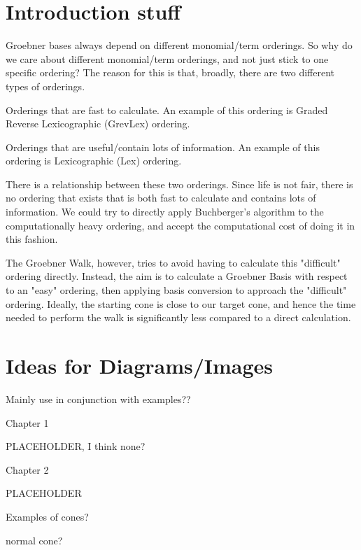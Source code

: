 \documentclass[12pt,a4paper]{report}
\begin{document}
\section{Introduction stuff}

Groebner bases always depend on different monomial/term orderings. So why do we care about different monomial/term orderings, and not just stick to one specific ordering? The reason for this is that, broadly, there are two different types of orderings.
\begin{list}
    \item Orderings that are fast to calculate. An example of this ordering is Graded Reverse Lexicographic (GrevLex) ordering.
    \item Orderings that are useful/contain lots of information. An example of this ordering is Lexicographic (Lex) ordering.
\end{list}
There is a relationship between these two orderings. Since life is not fair, there is no ordering that exists that is both fast to calculate and contains lots of information. We could try to directly apply Buchberger's algorithm to the computationally heavy ordering, and accept the computational cost of doing it in this fashion.

The Groebner Walk, however, tries to avoid having to calculate this "difficult" ordering directly. Instead, the aim is to calculate a Groebner Basis with respect to an "easy" ordering, then applying basis conversion to approach the "difficult" ordering. Ideally, the starting cone is close to our target cone, and hence the time needed to perform the walk is significantly less compared to a direct calculation.



\section{Ideas for Diagrams/Images}
Mainly use in conjunction with examples??

Chapter 1
\begin{list}
    \item PLACEHOLDER, I think none? 
\end{list}

Chapter 2
\begin{list}
    \item PLACEHOLDER
    \item Examples of cones?
    \item normal cone?
    \item 
\end{list}
\end{document}
